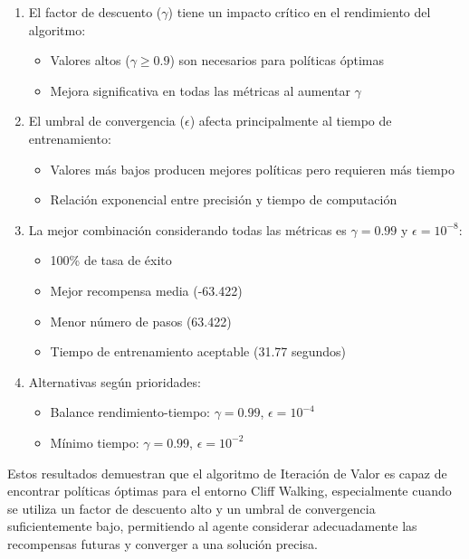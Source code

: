 \begin{enumerate}
    \item El factor de descuento ($\gamma$) tiene un impacto crítico en el rendimiento del algoritmo:
    \begin{itemize}
        \item Valores altos ($\gamma \geq 0.9$) son necesarios para políticas óptimas
        \item Mejora significativa en todas las métricas al aumentar $\gamma$
    \end{itemize}

    \item El umbral de convergencia ($\epsilon$) afecta principalmente al tiempo de entrenamiento:
    \begin{itemize}
        \item Valores más bajos producen mejores políticas pero requieren más tiempo
        \item Relación exponencial entre precisión y tiempo de computación
    \end{itemize}

    \item La mejor combinación considerando todas las métricas es $\gamma = 0.99$ y $\epsilon = 10^{-8}$:
    \begin{itemize}
        \item 100\% de tasa de éxito
        \item Mejor recompensa media (-63.422)
        \item Menor número de pasos (63.422)
        \item Tiempo de entrenamiento aceptable (31.77 segundos)
    \end{itemize}

    \item Alternativas según prioridades:
    \begin{itemize}
        \item Balance rendimiento-tiempo: $\gamma = 0.99$, $\epsilon = 10^{-4}$
        \item Mínimo tiempo: $\gamma = 0.99$, $\epsilon = 10^{-2}$
    \end{itemize}
\end{enumerate}

Estos resultados demuestran que el algoritmo de Iteración de Valor es capaz de encontrar políticas óptimas para el entorno Cliff Walking, especialmente cuando se utiliza un factor de descuento alto y un umbral de convergencia suficientemente bajo, permitiendo al agente considerar adecuadamente las recompensas futuras y converger a una solución precisa.

\newpage